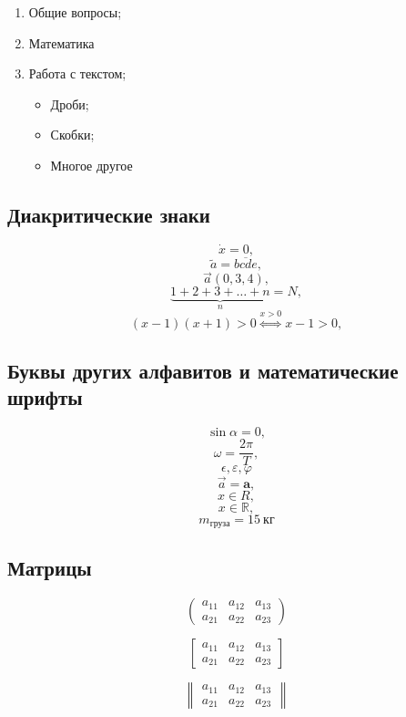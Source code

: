 \documentclass[a4paper,12pt]{article} %
\begin{document}
\begin{enumerate}


\item Общие вопросы;
\item Математика
\item Работа с текстом;

\begin{itemize}
\item Дроби;
\item Скобки;
\item Многое другое
\end{itemize}
\end{enumerate}


\subsection{Диакритические знаки}

\[ \dot{x}=0, \]
\[ \tilde{a}=\overline{bcde}, \]
\[ \overrightarrow{a} (0,3,4), \]
\[ \underbrace{1+2+3+\dots+n}_{n}=N, \]
\[ (x-1)(x+1)>0 \stackrel{x>0}{\Longleftrightarrow} x-1>0, \]


\subsection{Буквы других алфавитов и математические шрифты}

\[ \sin \alpha = 0, \]
\[ \omega = \frac{2\pi}{T}, \]
\[ \epsilon, \varepsilon, \varphi \]
\[ \overrightarrow{a}=\mathbf{a}, \]
\[ x\in R, \]
\[ x\in \mathbb{R}, \]
\[ m_{\text{груза}}= 15~\text{кг} \]


\subsection{Матрицы}

\[ \begin{pmatrix}
a_{11} & a_{12} & a_{13} \\
a_{21} & a_{22} & a_{23}
\end{pmatrix} \]

\[ \begin{bmatrix}
a_{11} & a_{12} & a_{13} \\
a_{21} & a_{22} & a_{23}
\end{bmatrix} \]

\[ \begin{Vmatrix}
a_{11} & a_{12} & a_{13} \\
a_{21} & a_{22} & a_{23}
\end{Vmatrix} \]
\end{document}
